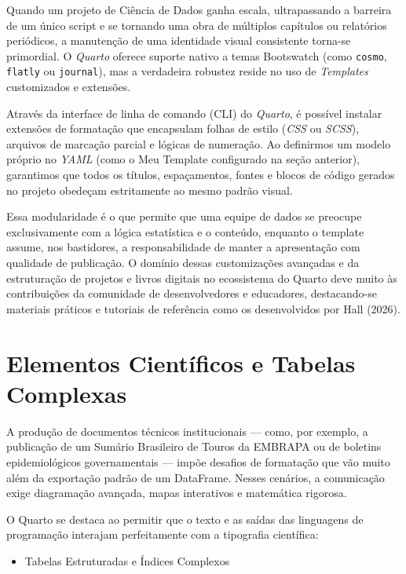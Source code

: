 \documentclass[
  brazilian,
  letterpaper,
  DIV=11,
  numbers=noendperiod]{scrreprt}
\providecommand{\tightlist}{%
  \setlength{\itemsep}{0pt}\setlength{\parskip}{0pt}}
\begin{document}
Quando um projeto de Ciência de Dados ganha escala, ultrapassando a
barreira de um único script e se tornando uma obra de múltiplos
capítulos ou relatórios periódicos, a manutenção de uma identidade
visual consistente torna-se primordial. O \emph{Quarto} oferece suporte
nativo a temas Bootswatch (como \texttt{cosmo}, \texttt{flatly} ou
\texttt{journal}), mas a verdadeira robustez reside no uso de
\emph{Templates} customizados e extensões.

Através da interface de linha de comando (CLI) do \emph{Quarto}, é
possível instalar extensões de formatação que encapsulam folhas de
estilo (\emph{CSS} ou \emph{SCSS}), arquivos de marcação parcial e
lógicas de numeração. Ao definirmos um modelo próprio no \emph{YAML}
(como o Meu Template configurado na seção anterior), garantimos que
todos os títulos, espaçamentos, fontes e blocos de código gerados no
projeto obedeçam estritamente ao mesmo padrão visual.

Essa modularidade é o que permite que uma equipe de dados se preocupe
exclusivamente com a lógica estatística e o conteúdo, enquanto o
template assume, nos bastidores, a responsabilidade de manter a
apresentação com qualidade de publicação. O domínio dessas customizações
avançadas e da estruturação de projetos e livros digitais no ecossistema
do Quarto deve muito às contribuições da comunidade de desenvolvedores e
educadores, destacando-se materiais práticos e tutoriais de referência
como os desenvolvidos por Hall (2026).

\section{Elementos Científicos e Tabelas
Complexas}\label{elementos-cientuxedficos-e-tabelas-complexas}

A produção de documentos técnicos institucionais --- como, por exemplo,
a publicação de um Sumário Brasileiro de Touros da EMBRAPA ou de
boletins epidemiológicos governamentais --- impõe desafios de formatação
que vão muito além da exportação padrão de um DataFrame. Nesses
cenários, a comunicação exige diagramação avançada, mapas interativos e
matemática rigorosa.

O Quarto se destaca ao permitir que o texto e as saídas das linguagens
de programação interajam perfeitamente com a tipografia científica:

\begin{itemize}
\tightlist
\item
  Tabelas Estruturadas e Índices Complexos
\end{itemize}
\end{document}
